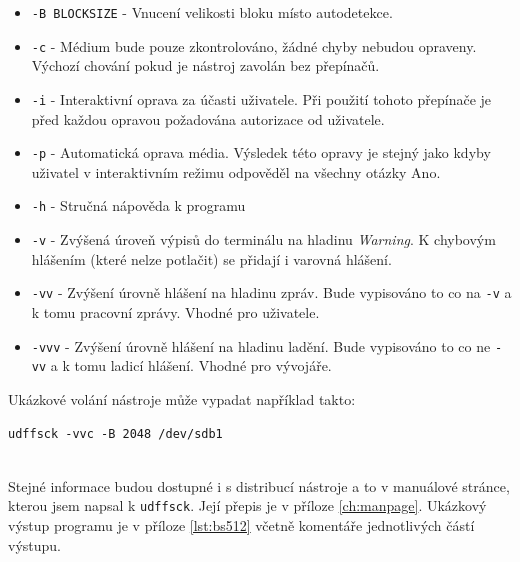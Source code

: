 \begin{itemize} 
    \item \texttt{-B BLOCKSIZE} - Vnucení velikosti bloku místo autodetekce.
    \item \texttt{-c} - Médium bude pouze zkontrolováno, žádné chyby nebudou opraveny. Výchozí chování pokud je nástroj zavolán bez přepínačů.
    \item \texttt{-i} - Interaktivní oprava za účasti uživatele. Při použití tohoto přepínače je před každou opravou požadována autorizace od uživatele. 
    \item \texttt{-p} - Automatická oprava média. Výsledek této opravy je stejný jako kdyby uživatel v interaktivním režimu odpověděl na všechny otázky Ano.
    \item \texttt{-h} - Stručná nápověda k programu
    \item \texttt{-v} - Zvýšená úroveň výpisů do terminálu na hladinu \textit{Warning}. K chybovým hlášením (které nelze potlačit) se přidají i varovná hlášení.
    \item \texttt{-vv} - Zvýšení úrovně hlášení na hladinu zpráv. Bude vypisováno to co na \texttt{-v} a k tomu pracovní zprávy. Vhodné pro uživatele.
    \item \texttt{-vvv} - Zvýšení úrovně hlášení na hladinu ladění. Bude vypisováno to co ne \texttt{-vv} a k tomu ladicí hlášení. Vhodné pro vývojáře.
\end{itemize}
Ukázkové volání nástroje může vypadat například takto:\\
\centerline{\texttt{udffsck -vvc -B 2048 /dev/sdb1}}\\
Stejné informace budou dostupné i s distribucí nástroje a to v manuálové stránce, kterou jsem napsal k \texttt{udffsck}. Její přepis je v příloze \ref{ch:manpage}.
Ukázkový výstup programu je v příloze \ref{lst:bs512} včetně komentáře jednotlivých částí výstupu. 

